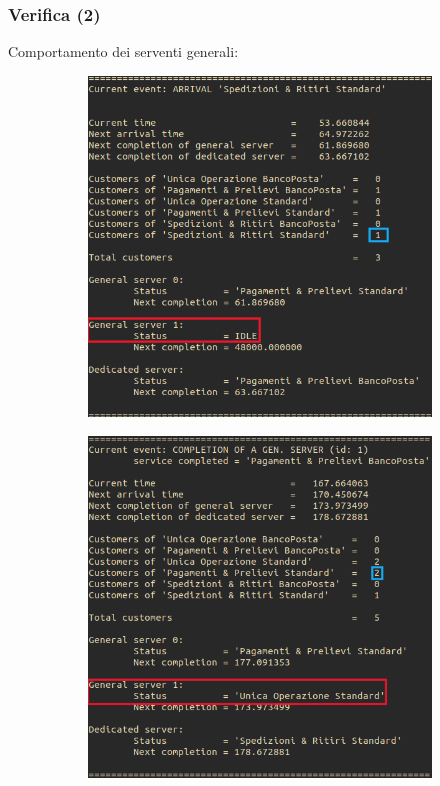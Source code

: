 \documentclass[
	usepdftitle=false,
	xcolor={table, dvipsnames},
	hyperref={
		pdftitle={Studio delle prestazioni di un Ufficio Postale ispirato a Poste Italiane},
    	pdfauthor={A. Chillotti, C. Cuffaro e S. Tiberi}
    }
]{beamer}
\begin{document}
\begin{frame}
\begin{figure}[ht]
\begin{subfigure}[b]{0.475\textwidth}
\end{subfigure}
\end{figure}
\end{frame}

\begin{frame}
\frametitle{Verifica (2)}
Comportamento dei serventi generali:
\begin{figure}[ht]
\begin{subfigure}[b]{0.475\textwidth}   
\centering 
\includegraphics[width=\textwidth]{screenshots/original/gen_servers_no_SR}
\end{subfigure}
\hfill
\begin{subfigure}[b]{0.475\textwidth}   
\centering 
\includegraphics[width=\textwidth]{screenshots/original/gen_servers_priority_sched}

\end{subfigure}
\end{figure}
\end{frame}
\end{document}
